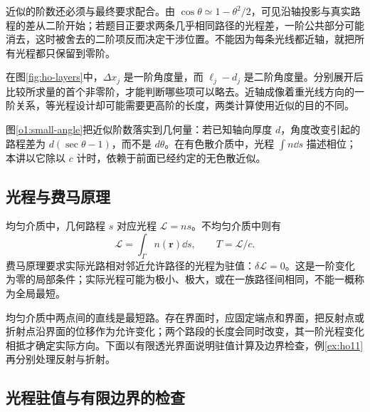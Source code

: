 近似的阶数还必须与最终要求配合。由 $\cos\theta\simeq1-\theta^2/2$，可见沿轴投影与真实路程的差从二阶开始；若题目正要求两条几乎相同路径的光程差，一阶公共部分可能消去，这时被舍去的二阶项反而决定干涉位置。不能因为每条光线都近轴，就把所有光程都只保留到零阶。

在图\ref{fig:ho-layers}中，$\Delta x_j$ 是一阶角度量，而 $\ell_j-d_j$ 是二阶角度量。分别展开后比较所求量的首个非零阶，才能判断哪些项可以略去。近轴成像着重光线方向的一阶关系，等光程设计却可能需要更高阶的长度，两类计算使用近似的目的不同。

图\ref{o1:small-angle}把近似阶数落实到几何量：若已知轴向厚度 $d$，角度改变引起的路程差为 $d(\sec\theta-1)$，而不是 $d\theta$。在有色散介质中，光程 $\int n\dd s$ 描述相位；本讲以它除以 $c$ 计时，依赖于前面已经约定的无色散近似。


\subsection{光程与费马原理}

均匀介质中，几何路程 $s$ 对应光程 $\mathcal L=ns$。不均匀介质中则有
\[
\mathcal L=\int_\Gamma n(\bm r)\dd s,\qquad T=\mathcal L/c.
\]
费马原理要求实际光路相对邻近允许路径的光程为驻值：$\delta\mathcal L=0$。这是一阶变化为零的局部条件；实际光程可能为极小、极大，或在一族路径间相同，不能一概称为全局最短。

均匀介质中两点间的直线是最短路。存在界面时，应固定端点和界面，把反射点或折射点沿界面的位移作为允许变化；两个路段的长度会同时改变，其一阶光程变化相抵才确定实际方向。下面以有限透光界面说明驻值计算及边界检查，例\ref{ex:ho11}再分别处理反射与折射。

\subsection{光程驻值与有限边界的检查}

